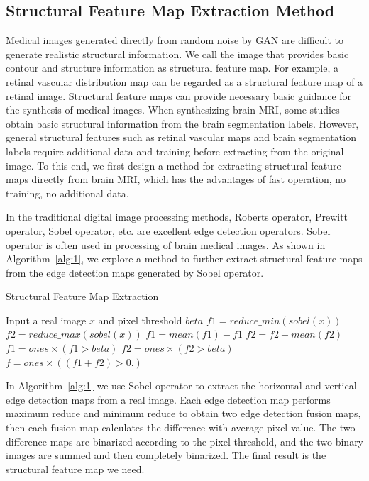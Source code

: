 \documentclass[letterpaper]{article} %
\begin{document}
\subsection{Structural Feature Map Extraction Method}
Medical images generated directly from random noise by GAN are difficult to generate realistic structural information. We call the image that provides basic contour and structure information as structural feature map. For example, a retinal vascular distribution map can be regarded as a structural feature map of a retinal image\cite{41costa2017towards}. Structural feature maps can provide necessary basic guidance for the synthesis of medical images. When synthesizing brain MRI, some studies obtain basic structural information from the brain segmentation labels\cite{4shin2018medical}. However, general structural features such as retinal vascular maps and brain segmentation labels require additional data and training before extracting from the original image. To this end, we first design a method for extracting structural feature maps directly from brain MRI, which has the advantages of fast operation, no training, no additional data.

In the traditional digital image processing methods, Roberts operator, Prewitt operator, Sobel operator, etc. are excellent edge detection operators. Sobel operator is often used in processing of brain medical images. As shown in Algorithm~\ref{alg:1}, we explore a method to further extract structural feature maps from the edge detection maps generated by Sobel operator.
\begin{algorithm}
	\caption{Structural Feature Map Extraction}
	\label{alg:1}
	\begin{algorithmic}[1]
		\State Input a real image $x$ and pixel threshold $beta$
		\State $f1 = reduce\_min(sobel(x))$
		\State $f2 = reduce\_max(sobel(x))$
		\State $f1 = mean(f1) - f1$
		\State $f2 = f2 - mean(f2)$
		\State $f1 = ones \times (f1 > beta)$
		\State $f2 = ones \times (f2 > beta)$
		\State $f = ones \times ((f1 + f2)> 0.)$
	\end{algorithmic}  
\end{algorithm}

In Algorithm~\ref{alg:1} we use Sobel operator to extract the horizontal and vertical edge detection maps from a real image. Each edge detection map performs maximum reduce and minimum reduce to obtain two edge detection fusion maps, then each fusion map calculates the difference with average pixel value. The two difference maps are binarized according to the pixel threshold, and the two binary images are summed and then completely binarized. The final result is the structural feature map we need.
\end{document}
